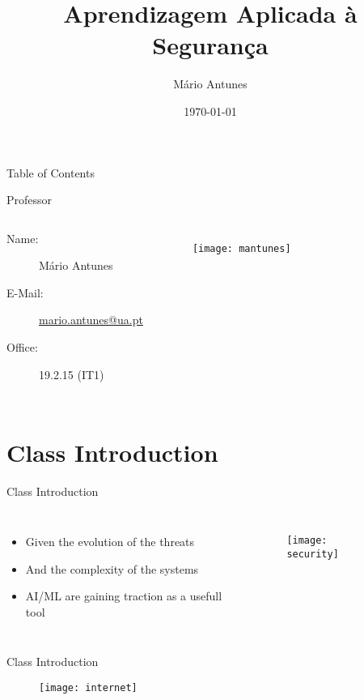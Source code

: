 \documentclass[hyperref={hidelinks}]{beamer}
\title{Aprendizagem Aplicada à Segurança}
\date{\today}
\author{Mário Antunes}
\institute{University of Aveiro}
\begin{document}
  \maketitle

  \begin{frame}{Table of Contents}
    \tableofcontents
  \end{frame}

  \begin{frame}{Professor}
    \begin{columns}
      \begin{description}
        \item[Name:] Mário Antunes
        \item[E-Mail:] \href{mailto:mario.antunes@ua.pt}{\url{mario.antunes@ua.pt}}
        \item[Office:] 19.2.15 (IT1)
      \end{description}
      \begin{figure}
      \centering
      \texttt{[image: mantunes]}
      \end{figure}
    \end{columns}
  \end{frame}

  \section{Class Introduction}
  \begin{frame}{Class Introduction}
    \begin{columns}
      \begin{itemize}
        \item Given the evolution of the threats
        \item And the complexity of the systems
        \item AI/ML are gaining traction as a usefull tool
      \end{itemize}
      \begin{figure}
      \centering
      \texttt{[image: security]}
      \end{figure}
    \end{columns}  
  \end{frame}

  \begin{frame}{Class Introduction}
    \begin{figure}
    \centering
    \texttt{[image: internet]}
    \end{figure}
  \end{frame}
\end{document}
